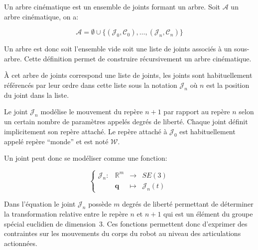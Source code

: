 \begin{mydef}
  Un arbre cinématique est un ensemble de joints formant un arbre.
  Soit $\mathcal{A}$ un arbre cinématique, on a:

  \begin{equation}
    \mathcal{A} = \emptyset \cup \{ (\mathcal{J}_0, \mathcal{C}_0),
    \dotsc, (\mathcal{J}_n, \mathcal{C}_n) \}
  \end{equation}

  Un arbre est donc soit l'ensemble vide soit une liste de joints
  associés à un sous-arbre. Cette définition permet de construire
  récursivement un arbre cinématique.

  À cet arbre de joints correspond une liste de joints, les joints
  sont habituellement référencés par leur ordre dans cette liste sous
  la notation $\mathcal{J}_n$ où $n$ est la position du joint dans la
  liste.
\end{mydef}

\begin{mydef}
  Le joint $\mathcal{J}_n$ modélise le mouvement du repère $n+1$ par
  rapport au repère $n$ selon un certain nombre de paramètres appelés
  degrés de liberté. Chaque joint définit implicitement son repère
  attaché. Le repère attaché à $\mathcal{J}_0$ est habituellement
  appelé repère ``monde'' et est noté $\mathcal{W}$.

  Un joint peut donc se modéliser comme une fonction:

  \begin{equation}
    \left\{
    \begin{array}{cccc}
      \mathcal{J}_n : & \mathbb{R}^m & \rightarrow & SE(3)\\
      & \mathbf{q} & \mapsto & \mathcal{J}_n(t)
    \end{array}
    \right.
  \end{equation}

  Dans l'équation le joint $\mathcal{J}_n$ possède $m$ degrés de
  liberté permettant de déterminer la transformation relative entre le
  repère $n$ et $n + 1$ qui est un élément du groupe spécial euclidien
  de dimension 3. Ces fonctions permettent donc d'exprimer des
  contraintes sur les mouvements du corps du robot au niveau des
  articulations actionnées.
\end{mydef}

